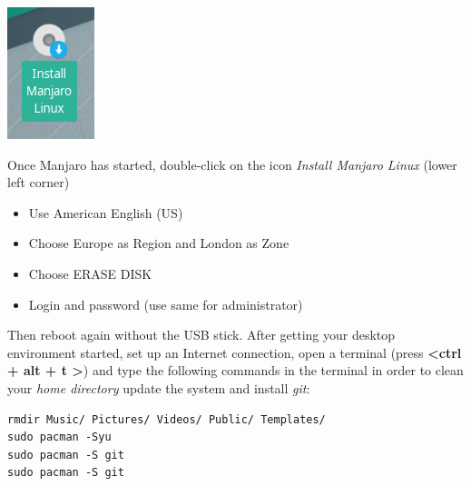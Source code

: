 \begin{minipage}[c]{0.15\textwidth}
\includegraphics[width=\textwidth]{images/manjaro0.png}
\end{minipage}
\hfill
\begin{minipage}[c]{0.75\textwidth}
Once Manjaro has started, double-click on the icon \emph{Install Manjaro Linux}
(lower left corner)
\begin{itemize}
	\item Use American English (US)
	\item Choose Europe as Region and London as Zone
	\item Choose ERASE DISK
	\item Login and password (use same for administrator)
\end{itemize}
\end{minipage}
\par
\vspace{11pt}
Then reboot again without the USB stick. After getting your desktop environment 
started, set up an Internet connection, open a terminal (press 
\textbf{\textless ctrl + alt + t \textgreater}) and type the following commands
in the terminal in order to clean your \textit{home directory} 
update the system and install \textit{git}:
\begin{lstlisting}
rmdir Music/ Pictures/ Videos/ Public/ Templates/
sudo pacman -Syu
sudo pacman -S git
sudo pacman -S git
\end{lstlisting}

